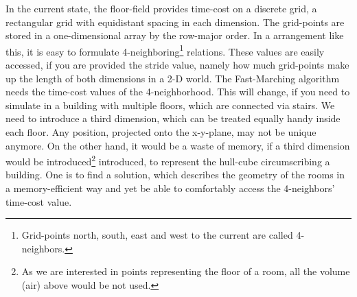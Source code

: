 In the current state, the floor-field provides time-cost on a discrete grid, a rectangular grid with equidistant spacing in each dimension. The grid-points are stored in a one-dimensional array by the row-major order. In a arrangement like this, it is easy to formulate 4-neighboring\footnote{Grid-points north, south, east and west to the current are called 4-neighbors.} relations.  These values are easily accessed, if you are provided the stride value, namely how much grid-points make up the length of both dimensions in a 2-D world. The Fast-Marching algorithm needs the time-cost values of the 4-neighborhood.
This will change, if you need to simulate in a building with multiple floors, which are connected via stairs. We need to introduce a third dimension, which can be treated equally handy inside each floor. Any position, projected onto the x-y-plane, may not be unique anymore. On the other hand, it would be a waste of memory, if a third dimension would be introduced\footnote{As we are interested in points representing the floor of a room, all the volume (air) above would be not used.} introduced, to represent the hull-cube circumscribing a building.
One is to find a solution, which describes the geometry of the rooms in a memory-efficient way and yet be able to comfortably access the 4-neighbors' time-cost value.



